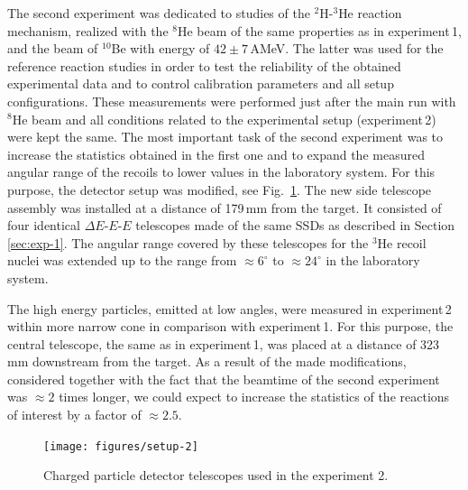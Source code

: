 The second experiment was dedicated to studies of the $^2$H-$^3$He reaction mechanism, realized with the $^8$He beam of the same properties as in experiment\,1, and the beam of $^{10}$Be with energy of $42\pm7$\,AMeV.
The latter was used for the reference reaction studies in order to test the reliability of the obtained experimental data and to control calibration parameters and all setup configurations.
These measurements were performed just after the main run with $^8$He beam and all conditions related to the experimental setup (experiment\,2) were kept the same.
The most important task of the second experiment was to increase the statistics obtained in the first one and to expand the measured angular range of the recoils to lower values in the laboratory system.
For this purpose, the detector setup was modified, see Fig.\ \ref{fig:setup-2}.
The new side telescope assembly was installed at a distance of 179\,mm from the target.
It consisted of four identical $\Delta E$-$E$-$E$ telescopes made of the same SSDs as described in Section \ref{sec:exp-1}.
The angular range covered by these telescopes for the $^3$He recoil nuclei was extended up to the range from $\approx 6^{\circ}$ to $\approx 24^{\circ}$ in the laboratory system.

The high energy particles, emitted at low angles, were measured in experiment\,2 within more narrow cone in comparison with experiment\,1.
For this purpose, the central telescope, the same as in experiment\,1, was placed at a distance of 323\,mm downstream from the target.
As a result of the made modifications, considered together with the fact that the beamtime of the second experiment was $\approx2$ times longer, we could expect to increase the statistics of the reactions of interest by a factor of $\approx 2.5$.

\begin{figure}
	\begin{center}
		\texttt{[image: figures/setup-2]}
	\end{center}
	\caption{Charged particle detector telescopes used in the experiment 2.}
	\label{fig:setup-2}
\end{figure}

